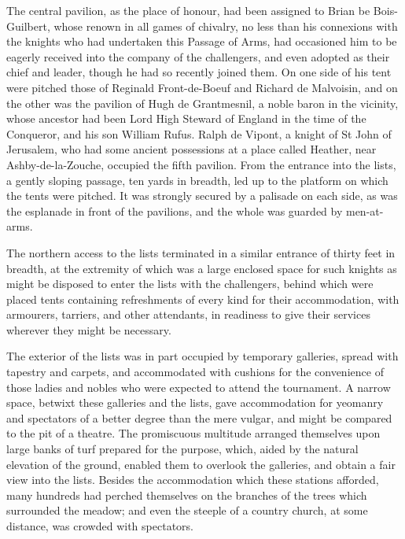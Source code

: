 The central pavilion, as the place of honour, had been assigned to Brian
be Bois-Guilbert, whose renown in all games of chivalry, no less than
his connexions with the knights who had undertaken this Passage of Arms,
had occasioned him to be eagerly received into the company of the
challengers, and even adopted as their chief and leader, though he had
so recently joined them. On one side of his tent were pitched those of
Reginald Front-de-Boeuf and Richard de Malvoisin, and on the other was
the pavilion of Hugh de Grantmesnil, a noble baron in the vicinity,
whose ancestor had been Lord High Steward of England in the time of the
Conqueror, and his son William Rufus. Ralph de Vipont, a knight of St
John of Jerusalem, who had some ancient possessions at a place called
Heather, near Ashby-de-la-Zouche, occupied the fifth pavilion. From the
entrance into the lists, a gently sloping passage, ten yards in breadth,
led up to the platform on which the tents were pitched. It was strongly
secured by a palisade on each side, as was the esplanade in front of the
pavilions, and the whole was guarded by men-at-arms.

The northern access to the lists terminated in a similar entrance of
thirty feet in breadth, at the extremity of which was a large enclosed
space for such knights as might be disposed to enter the lists with the
challengers, behind which were placed tents containing refreshments of
every kind for their accommodation, with armourers, tarriers, and other
attendants, in readiness to give their services wherever they might be
necessary.

The exterior of the lists was in part occupied by temporary galleries,
spread with tapestry and carpets, and accommodated with cushions for the
convenience of those ladies and nobles who were expected to attend the
tournament. A narrow space, betwixt these galleries and the lists, gave
accommodation for yeomanry and spectators of a better degree than the
mere vulgar, and might be compared to the pit of a theatre. The
promiscuous multitude arranged themselves upon large banks of turf
prepared for the purpose, which, aided by the natural elevation of the
ground, enabled them to overlook the galleries, and obtain a fair view
into the lists. Besides the accommodation which these stations afforded,
many hundreds had perched themselves on the branches of the trees which
surrounded the meadow; and even the steeple of a country church, at some
distance, was crowded with spectators.

